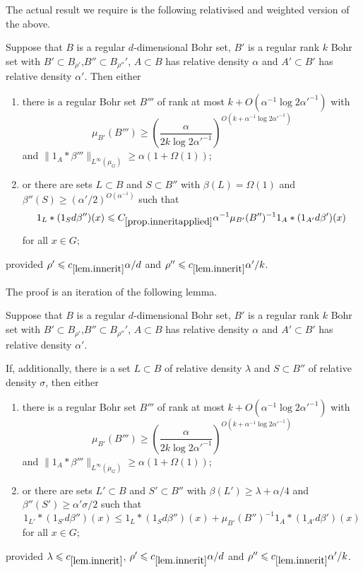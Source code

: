 \documentclass[12pt]{amsart}  %
\begin{document}
The actual result we require is the following relativised and weighted version of the above.
\begin{proposition}\label{prop.inneritapplied}
Suppose that $B$ is a regular $d$-dimensional Bohr set, $B'$ is a regular rank $k$ Bohr set with $B' \subset B_{\rho'}$,$B''\subset B_{\rho''}'$, $A \subset B$ has relative density $\alpha$ and $A' \subset B'$ has relative density $\alpha'$. Then either
\begin{enumerate}
\item there is a regular Bohr set $B'''$ of rank at most $k+O(\alpha^{-1}\log2\alpha'^{-1})$ with
\begin{equation*}
\mu_{B'}(B''') \geq \left(\frac{\alpha}{2k\log 2\alpha'^{-1}}\right)^{O(k+\alpha^{-1}\log2\alpha'^{-1})}
\end{equation*}
and $\|1_A \ast \beta'''\|_{L^\infty(\mu_G)} \geq \alpha(1+\Omega(1))$;
\item or there are sets $L\subset B$ and $S\subset B''$ with $\beta(L) =\Omega(1)$ and $\beta''(S) \geq (\alpha'/2)^{O(\alpha^{-1})}$ such that
\begin{equation*}
1_L \ast (1_Sd\beta'')(x) \leq C_{\ref{prop.inneritapplied}}\alpha^{-1}\mu_{B'}(B'')^{-1} 1_A \ast (1_{A'}d\beta')(x)
\end{equation*}
for all $x \in G$;
\end{enumerate}
provided $\rho' \leq c_{\ref{lem.innerit}}\alpha/d$ and $\rho'' \leq c_{\ref{lem.innerit}}\alpha'/k$.
\end{proposition}
The proof is an iteration of the following lemma.
\begin{lemma}\label{lem.innerit}
Suppose that $B$ is a regular $d$-dimensional Bohr set, $B'$ is a regular rank $k$ Bohr set with $B' \subset B_{\rho'}$,$B''\subset B_{\rho''}'$, $A \subset B$ has relative density $\alpha$ and $A' \subset B'$ has relative density $\alpha'$.

If, additionally, there is a set $L \subset B$ of relative density $\lambda$ and $S \subset B''$ of relative density $\sigma$, then either
\begin{enumerate}
\item there is a regular Bohr set $B'''$ of rank at most $k+O(\alpha^{-1}\log2\alpha'^{-1})$ with
\begin{equation*}
\mu_{B'}(B''') \geq \left(\frac{\alpha}{2k\log 2\alpha'^{-1}}\right)^{O(k+\alpha^{-1}\log2\alpha'^{-1})}
\end{equation*}
and $\|1_A \ast \beta'''\|_{L^\infty(\mu_G)} \geq \alpha(1+\Omega(1))$;
\item or there are sets $L'\subset B$ and $S'\subset B''$ with $\beta(L') \geq \lambda + \alpha/4$ and $\beta''(S') \geq \alpha'\sigma/2$ such that
\begin{equation*}
1_{L'} \ast (1_{S'}d\beta'')(x) \leq 1_L \ast (1_Sd\beta'')(x) +  \mu_{B'}(B'')^{-1}1_{A} \ast (1_{A'}d\beta')(x)
\end{equation*}
for all $x \in G$;
\end{enumerate}
provided $\lambda \leq c_{\ref{lem.innerit}}$, $\rho' \leq c_{\ref{lem.innerit}}\alpha/d$ and $\rho'' \leq c_{\ref{lem.innerit}}\alpha'/k$.
\end{lemma}
\end{document}
